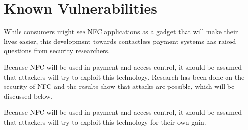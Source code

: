 
\section{Known Vulnerabilities}


While consumers might see NFC applications as a gadget that will make their lives easier, this development towards contactless payment systems has raised questions from security researchers.

Because NFC will be used in payment and access control, it should be assumed that attackers will try to exploit this technology. Research has been done on the security of NFC and the results show that attacks are possible, which will be discussed below.

Because NFC will be used in payment and access control, it should be assumed that attackers will try to exploit this technology for their own gain. 


